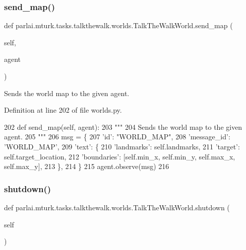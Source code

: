 \subsubsection{\texorpdfstring{send\+\_\+map()}{send\_map()}}
{\footnotesize\ttfamily def parlai.\+mturk.\+tasks.\+talkthewalk.\+worlds.\+Talk\+The\+Walk\+World.\+send\+\_\+map (\begin{DoxyParamCaption}\item[{}]{self,  }\item[{}]{agent }\end{DoxyParamCaption})}

\begin{DoxyVerb}Sends the world map to the given agent.
\end{DoxyVerb}
 

Definition at line 202 of file worlds.\+py.


\begin{DoxyCode}
202     \textcolor{keyword}{def }send\_map(self, agent):
203         \textcolor{stringliteral}{"""}
204 \textcolor{stringliteral}{        Sends the world map to the given agent.}
205 \textcolor{stringliteral}{        """}
206         msg = \{
207             \textcolor{stringliteral}{'id'}: \textcolor{stringliteral}{"WORLD\_MAP"},
208             \textcolor{stringliteral}{'message\_id'}: \textcolor{stringliteral}{'WORLD\_MAP'},
209             \textcolor{stringliteral}{'text'}: \{
210                 \textcolor{stringliteral}{'landmarks'}: self.landmarks,
211                 \textcolor{stringliteral}{'target'}: self.target\_location,
212                 \textcolor{stringliteral}{'boundaries'}: [self.min\_x, self.min\_y, self.max\_x, self.max\_y],
213             \},
214         \}
215         agent.observe(msg)
216 
\end{DoxyCode}
\mbox{\label{classparlai_1_1mturk_1_1tasks_1_1talkthewalk_1_1worlds_1_1TalkTheWalkWorld_a123c230bcd187f7c8a223ea8d4a02927}} 
\subsubsection{\texorpdfstring{shutdown()}{shutdown()}}
{\footnotesize\ttfamily def parlai.\+mturk.\+tasks.\+talkthewalk.\+worlds.\+Talk\+The\+Walk\+World.\+shutdown (\begin{DoxyParamCaption}\item[{}]{self }\end{DoxyParamCaption})}



